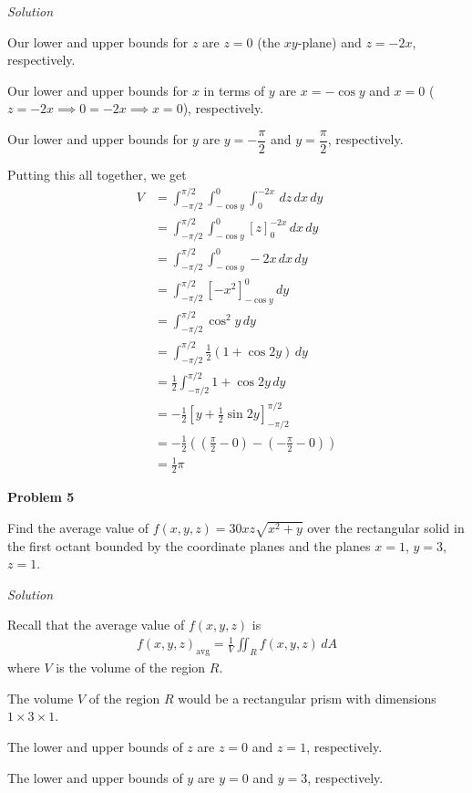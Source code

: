 \documentclass{article}
\newcommand{\lrp}[1]{\left( #1 \right)}
\newcommand{\lrb}[1]{\left[ #1 \right]}
\newcommand{\Solution}{\textit{Solution}}
\begin{document}
\Solution

Our lower and upper bounds for $z$ are $z=0$ (the $xy$-plane) and $z=-2x$, respectively.

Our lower and upper bounds for $x$ in terms of $y$ are $x=-\cos y$ and $x=0$ ($z=-2x\implies 0=-2x\implies x=0$), respectively.

Our lower and upper bounds for $y$ are $y=-\dfrac{\pi}{2}$ and $y=\dfrac{\pi}{2}$, respectively.

Putting this all together, we get
\begin{align*}
    V&=\int_{-\pi/2}^{\pi/2}\int_{-\cos y}^{0}\int_{0}^{-2x}\,dz\,dx\,dy\\
    &=\int_{-\pi/2}^{\pi/2}\int_{-\cos y}^{0}\lrb{z}_{0}^{-2x}\,dx\,dy\\
    &=\int_{-\pi/2}^{\pi/2}\int_{-\cos y}^{0} -2x\,dx\,dy\\
    &=\int_{-\pi/2}^{\pi/2}\lrb{-x^2}_{-\cos y}^{0}\,dy\\
    &=\int_{-\pi/2}^{\pi/2}\cos^2 y\,dy\\
    &=\int_{-\pi/2}^{\pi/2} \frac{1}{2}\lrp{1+\cos 2y}\,dy\\
    &=\frac{1}{2}\int_{-\pi/2}^{\pi/2} 1+\cos 2y\,dy\\
    &=-\frac{1}{2}\lrb{y+\frac{1}{2}\sin 2y}_{-\pi/2}^{\pi/2}\\
    &=-\frac{1}{2}\lrp{\lrp{\frac{\pi}{2}-0}-\lrp{-\frac{\pi}{2}-0}}\\
    &=\boxed{\frac{1}{2}\pi}
\end{align*}
{}\textbf{Problem 5}

Find the average value of $f(x,y,z) = 30xz\sqrt{x^2+y}$ over the rectangular solid in the
first octant bounded by the coordinate planes and the planes $x = 1$, $y = 3$, $z = 1$.

\Solution

Recall that the average value of $f(x,y,z)$ is
\begin{align*}
    f(x,y,z)_{\text{avg}}=\frac{1}{V}\iint_R f(x,y,z)\,dA
\end{align*}
where $V$ is the volume of the region $R$.

The volume $V$ of the region $R$ would be a rectangular prism with dimensions $1\times3\times 1$.

The lower and upper bounds of $z$ are $z=0$ and $z=1$, respectively.

The lower and upper bounds of $y$ are $y=0$ and $y=3$, respectively.
\end{document}
